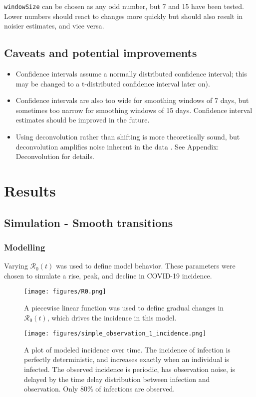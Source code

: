\documentclass{article}
\newcommand{\nR}{\mathcal{R}}
\newcommand{\code}[1]{\texttt{#1}}
\begin{document}
\code{windowSize} can be chosen as any odd number, but 7 and 15 have been tested. Lower numbers should react to changes more quickly but should also result in noisier estimates, and vice versa.

\subsection{Caveats and potential improvements}
\begin{itemize}
	\item Confidence intervals assume a normally distributed confidence interval; this may be changed to a t-distributed confidence interval later on). 
	\item Confidence intervals are also too wide for smoothing windows of 7 days, but sometimes too narrow for smoothing windows of 15 days. Confidence interval estimates should be improved in the future.
	\item Using deconvolution rather than shifting is more theoretically sound, but deconvolution amplifies noise inherent in the data \cite{Gostic} \cite{RLLoss}. See Appendix: Deconvolution for details.
\end{itemize}

\section{Results}

\subsection{Simulation - Smooth transitions}
\subsubsection{Modelling}

Varying $\nR_0(t)$ was used to define model behavior. These parameters were chosen to simulate a rise, peak, and decline in COVID-19 incidence.

\begin{figure}[h!]
\centering
\texttt{[image: figures/R0.png]}
\caption{A piecewise linear function was used to define gradual changes in $\nR_0(t)$, which drives the incidence in this model.}

\end{figure}

\clearpage
\begin{figure}[h!]
\centering
\texttt{[image: figures/simple\_observation\_1\_incidence.png]}
\caption{A plot of modeled incidence over time. The incidence of infection is perfectly deterministic, and increases exactly when an individual is infected. The observed incidence is periodic, has observation noise, is delayed by the time delay distribution between infection and observation. Only 80\% of infections are observed.}
\end{figure}
\end{document}
